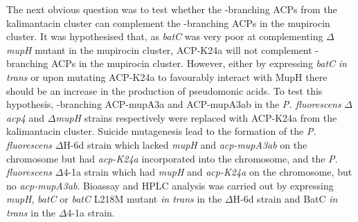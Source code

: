 The next obvious question was to test whether the \bet-branching ACPs from the kalimantacin cluster can complement the \bet-branching ACPs in the mupirocin cluster. It was hypothesised that, as \textit{batC} was very poor at complementing $ \Delta $\textit{mupH} mutant in the mupirocin cluster, ACP-K24a will not complement \bet-branching ACPs in the mupirocin cluster. However, either by expressing \textit{batC} \textit{in trans} or upon mutating ACP-K24a to favourably interact with MupH there should be an increase in the production of pseudomonic acids. To test this hypothesis, \bet-branching ACP-mupA3a and ACP-mupA3ab in the \textit{P. fluorescens}  $ \Delta $\textit{acp4} and  $ \Delta $\textit{mupH} strains respectively were replaced with ACP-K24a from the kalimantacin cluster. Suicide mutagenesis lead to the formation of the \textit{P. fluorescens} $ \Delta $H-6d strain which lacked \textit{mupH} and \textit{acp-mupA3ab} on the chromosome but had \textit{acp-K24a} incorporated into the chromosome, and the \textit{P. fluorescens} $ \Delta $4-1a strain which had \textit{mupH} and \textit{acp-K24a} on the chromosome, but no \textit{acp-mupA3ab}. Bioassay and HPLC analysis was carried out by expressing \textit{mupH}, \textit{batC} or \textit{batC} L218M mutant \textit{in trans} in the $ \Delta $H-6d strain and BatC \textit{in trans} in the $ \Delta $4-1a strain.

